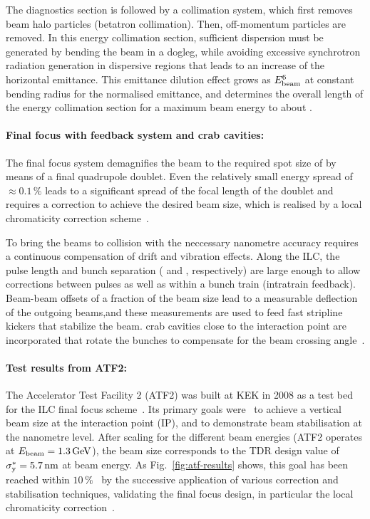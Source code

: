 The diagnostics section is followed by a collimation system, which first removes beam halo particles (betatron collimation). 
Then, off-momentum particles are removed.
In this energy collimation section, sufficient dispersion must be generated by bending the beam in a dogleg, while avoiding excessive synchrotron radiation generation in dispersive regions that leads to an increase of the horizontal emittance.
This emittance dilution effect grows as $E_{\mathrm{beam}}^6$ at constant bending radius for the normalised emittance, and determines the overall length of the energy collimation section for a maximum  beam energy to about .


\paragraph {Final focus with feedback system and crab cavities:}
\label{par:final_focus}

The final focus system demagnifies the beam to the required spot size of  by means of a final quadrupole doublet.
Even the relatively small energy spread of $\approx 0.1\,\%$ leads to a significant spread of the focal length of the doublet and requires a correction to achieve the desired beam size, which is realised by a local chromaticity correction scheme~\cite{Raimondi:2000cx}.

To bring the beams to collision with the neccessary nanometre accuracy requires a continuous compensation of drift and vibration effects.
Along the ILC, the pulse length and bunch separation ( and , respectively) are large enough to allow corrections between pulses as well as within a bunch train (intratrain feedback).
Beam-beam offsets of a fraction of the beam size lead to a measurable deflection of the outgoing beams,and these measurements are used to feed fast stripline kickers that stabilize the beam.
 crab cavities close to the interaction point are incorporated that rotate the bunches to compensate for the  beam crossing angle~\cite[Sect. 8.9]{Adolphsen:2013kya}.
 

\paragraph {Test results from ATF2:}
The Accelerator Test Facility 2 (ATF2) was built at KEK in 2008 as a test bed for the ILC final focus scheme~\cite[Sec. 3.6]{Adolphsen:2013jya}.
Its primary goals were~\cite{Grishanov:2005ek,Grishanov:2006kx} to achieve a  vertical beam size at the interaction point (IP), and to demonstrate beam stabilisation at the nanometre level.
After scaling for the different beam energies (ATF2 operates at $E_{\mathrm{beam}}=1.3\,{\mathrm{GeV}}$), the  beam size corresponds to the TDR design value of $\sigma_{\mathrm{y}}^* = 5.7\,{\mathrm{nm}}$ at  beam energy.
As Fig.~\ref{fig:atf-results} shows, this goal has been reached within $10\,\%$~\cite{Okugi:2017jji} by the successive application of various correction and stabilisation techniques, 
validating the final focus design, in particular the local chromaticity correction~\cite{White:2014vwa}.

